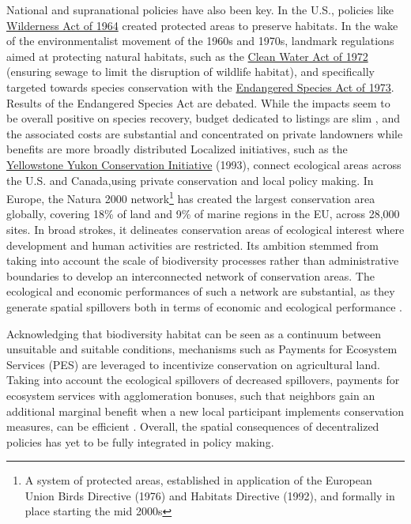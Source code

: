 National and supranational policies have also been key. In the U.S., policies like  \href{https://www.fs.usda.gov/Internet/FSE_DOCUMENTS/fseprd645666.pdf}{Wilderness Act of 1964} created protected areas to preserve habitats. In the wake of the environmentalist movement of the 1960s and 1970s, landmark regulations aimed at protecting natural habitats, such as the \href{https://www.epa.gov/laws-regulations/summary-clean-water-act}{Clean Water Act of 1972} (ensuring sewage to limit the disruption of wildlife habitat), and specifically targeted towards species conservation with the \href{https://www.fws.gov/sites/default/files/documents/endangered-species-act-accessible.pdf}{Endangered Species Act of 1973}. Results of the Endangered Species Act are debated. While the impacts seem to be overall positive on species recovery, budget dedicated to listings are slim , and the associated costs are substantial and concentrated on private landowners while benefits are more broadly distributed \citep{brown_economics_1998, langpap_economics_2018}
%
Localized initiatives, such as the \href{https://y2y.net/}{Yellowstone Yukon Conservation Initiative} (1993), connect ecological areas across the U.S. and Canada,using private conservation and local policy making. 
%
In Europe, the Natura 2000 network\footnote{A system of protected areas, established in application of the European Union Birds Directive (1976) and Habitats Directive (1992), and formally in place starting the mid 2000s} has created the largest conservation area globally, covering 18\% of land and 9\% of marine regions in the EU, across 28,000 sites. In broad strokes, it delineates conservation areas of ecological interest where development and human activities are restricted. Its ambition stemmed from taking into account the scale of biodiversity processes rather than administrative boundaries to develop an interconnected network of conservation areas. The ecological and economic performances of such a network are substantial, as they generate spatial spillovers both in terms of economic and ecological performance \citep{cocco_relaxing_2023}.

Acknowledging that biodiversity habitat can be seen as a continuum between unsuitable and suitable conditions, mechanisms such as Payments for Ecosystem Services (PES) are leveraged to incentivize conservation on agricultural land. Taking into account the ecological spillovers of decreased spillovers, payments for ecosystem services with agglomeration bonuses, such that neighbors gain an additional marginal benefit when a new local participant implements conservation measures, can be efficient \citep{parkhurst2002agglomeration, bareille_agglomeration_2023}. Overall, the spatial consequences of decentralized policies has yet to be fully integrated in policy making.

